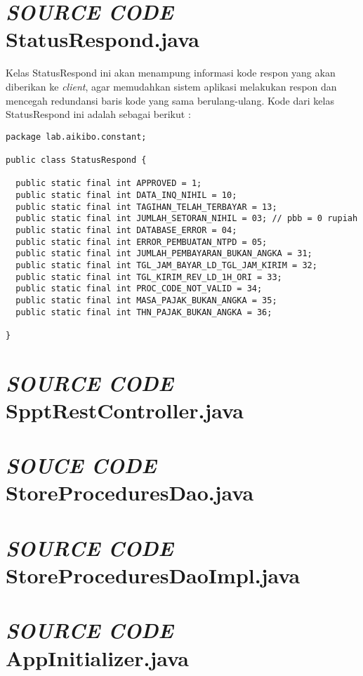 \documentclass[pdftex,12pt, oneside]{article}
\begin{document}
\section{\textit{SOURCE CODE} StatusRespond.java}

Kelas StatusRespond ini akan menampung informasi kode respon yang akan diberikan ke \textit{client}, agar memudahkan sistem aplikasi melakukan respon dan mencegah redundansi baris kode yang sama berulang-ulang. Kode dari kelas StatusRespond ini adalah sebagai berikut :

\begin{lstlisting}
package lab.aikibo.constant;

public class StatusRespond {

  public static final int APPROVED = 1;
  public static final int DATA_INQ_NIHIL = 10;
  public static final int TAGIHAN_TELAH_TERBAYAR = 13;
  public static final int JUMLAH_SETORAN_NIHIL = 03; // pbb = 0 rupiah
  public static final int DATABASE_ERROR = 04;
  public static final int ERROR_PEMBUATAN_NTPD = 05;
  public static final int JUMLAH_PEMBAYARAN_BUKAN_ANGKA = 31;
  public static final int TGL_JAM_BAYAR_LD_TGL_JAM_KIRIM = 32;
  public static final int TGL_KIRIM_REV_LD_1H_ORI = 33;
  public static final int PROC_CODE_NOT_VALID = 34;
  public static final int MASA_PAJAK_BUKAN_ANGKA = 35;
  public static final int THN_PAJAK_BUKAN_ANGKA = 36;

}
\end{lstlisting}


\section{\textit{SOURCE CODE} SpptRestController.java}




\section{\textit{SOUCE CODE} StoreProceduresDao.java}


\section{\textit{SOURCE CODE} StoreProceduresDaoImpl.java}


\section{\textit{SOURCE CODE} AppInitializer.java}
\end{document}
